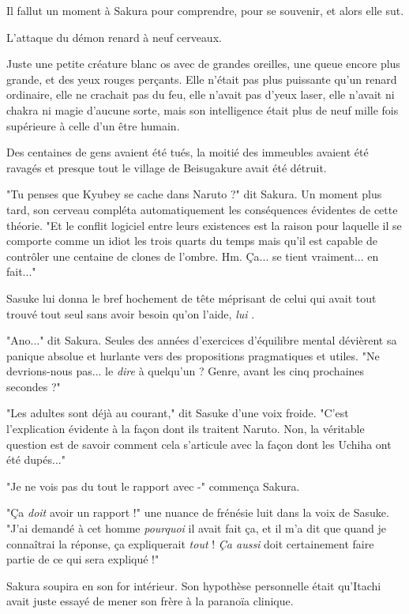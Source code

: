 Il fallut un moment à Sakura pour comprendre, pour se souvenir, et alors elle sut.

L'attaque du démon renard à neuf cerveaux.

Juste une petite créature blanc os avec de grandes oreilles, une queue encore plus grande, et des yeux rouges perçants. Elle n'était pas plus puissante qu'un renard ordinaire, elle ne crachait pas du feu, elle n'avait pas d'yeux laser, elle n'avait ni chakra ni magie d'aucune sorte, mais son intelligence était plus de neuf mille fois supérieure à celle d'un être humain.

Des centaines de gens avaient été tués, la moitié des immeubles avaient été ravagés et presque tout le village de Beisugakure avait été détruit.

"Tu penses que Kyubey se cache dans Naruto ?" dit Sakura. Un moment plus tard, son cerveau compléta automatiquement les conséquences évidentes de cette théorie. "Et le conflit logiciel entre leurs existences est la raison pour laquelle il se comporte comme un idiot les trois quarts du temps mais qu'il est capable de contrôler une centaine de clones de l'ombre. Hm. Ça... se tient vraiment... en fait..."

Sasuke lui donna le bref hochement de tête méprisant de celui qui avait tout trouvé tout seul sans avoir besoin qu'on l'aide, \emph{lui} .

"Ano..." dit Sakura. Seules des années d'exercices d'équilibre mental dévièrent sa panique absolue et hurlante vers des propositions pragmatiques et utiles. "Ne devrions-nous pas... le \emph{dire } à quelqu'un ? Genre, avant les cinq prochaines secondes ?"

"Les adultes sont déjà au courant," dit Sasuke d'une voix froide. "C'est l'explication évidente à la façon dont ils traitent Naruto. Non, la véritable question est de savoir comment cela s'articule avec la façon dont les Uchiha ont été dupés..."

"Je ne vois pas du tout le rapport avec -" commença Sakura.

"Ça \emph{doit}  avoir un rapport !" une nuance de frénésie luit dans la voix de Sasuke. "J'ai demandé à cet homme \emph{pourquoi}  il avait fait ça, et il m'a dit que quand je connaîtrai la réponse, ça expliquerait \emph{tout}  ! \emph{Ça aussi } doit certainement faire partie de ce qui sera expliqué !"

Sakura soupira en son for intérieur. Son hypothèse personnelle était qu'Itachi avait juste essayé de mener son frère à la paranoïa clinique.

